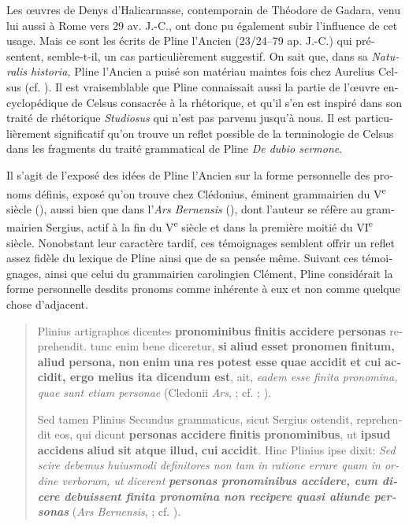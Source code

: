 \documentclass[french,output=paper,colorlinks,citecolor=brown]{../langscibook}
\begin{document}
\begin{otherlanguage}{french}
Les œuvres de Denys d’Halicarnasse, contemporain de Théodore de Gadara, venu lui aussi à Rome vers 29 av. J.-C., ont donc pu également subir l'influence de cet usage. Mais ce sont les écrits de Pline l’Ancien (23/24–79 ap. J.-C.) qui présentent, semble-t-il, un cas particulièrement suggestif. On sait que, dans sa \textit{Naturalis historia,} Pline l’Ancien a puisé son matériau maintes fois chez Aurelius Celsus (cf. \citealt[41--45, 56--70]{Münzer1897}). Il est vraisemblable que Pline connaissait aussi la partie de l’œuvre encyclopédique de Celsus consacrée à la rhétorique, et qu’il s’en est inspiré dans son traité de rhétorique \textit{Studiosus} qui n’est pas parvenu jusqu’à nous. Il est particulièrement significatif qu’on trouve un reflet possible de la terminologie de Celsus dans les fragments du traité grammatical de Pline \textit{De dubio sermone}.

Il s’agit de l’exposé des idées de Pline l’Ancien sur la forme personnelle des pronoms définis, exposé qu’on trouve chez Clédonius, éminent grammairien du V\textsuperscript{e} siècle (), aussi bien que dans l’\textit{Ars Bernensis} (), dont l’auteur se réfère au grammairien Sergius, actif à la fin du V\textsuperscript{e} siècle et dans la première moitié du VI\textsuperscript{e} siècle. Nonobstant leur caractère tardif, ces témoignages semblent offrir un reflet assez fidèle du lexique de Pline ainsi que de sa pensée même. Suivant ces témoignages, ainsi que celui du grammairien carolingien Clément, Pline considérait la forme personnelle desdits pronoms comme inhérente à eux et non comme quelque chose d’adjacent.

\begin{quote}
    Plinius artigraphos dicentes \textbf{pronominibus} \textbf{finitis} \textbf{accidere} \textbf{personas} reprehendit. tunc enim bene diceretur, \textbf{si} \textbf{aliud} \textbf{esset} \textbf{pronomen} \textbf{finitum,} \textbf{aliud} \textbf{persona,} \textbf{non} \textbf{enim} \textbf{una} \textbf{res} \textbf{potest} \textbf{esse} \textbf{quae} \textbf{accidit} \textbf{et} \textbf{cui} \textbf{accidit, ergo melius ita dicendum est}, ait, \textit{eadem esse finita pronomina, quae sunt etiam personae} (Cledonii \textit{Ars},  ; cf.  ; \citealt[301]{Della-Casa1969}).
    
    Sed tamen Plinius Secundus grammaticus, sicut Sergius ostendit, reprehendit eos, qui dicunt \textbf{personas} \textbf{accidere} \textbf{finitis} \textbf{pronominibus}, ut \textbf{ipsud} \textbf{accidens} \textbf{aliud} \textbf{sit} \textbf{atque} \textbf{illud,} \textbf{cui} \textbf{accidit}. Hinc Plinius ipse dixit: \textit{Sed scire debemus huiusmodi definitores non tam in ratione errare quam in ordine verborum, ut dicerent} \textbf{\textit{personas pronominibus accidere, cum dicere debuissent finita pronomina non recipere quasi aliunde personas}} (\textit{Ars Bernensis},  ; cf. \citealt[301--302]{Della-Casa1969}).
\end{quote}


\end{otherlanguage}
\end{document}
